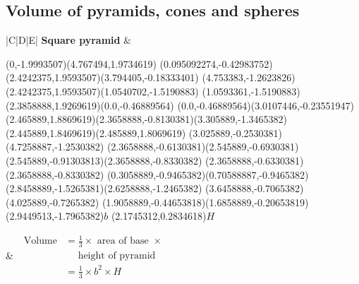 \subsection{Volume of pyramids, cones and spheres}


\begin{table}[H]
\begin{tabular}{|C|D|E|}
\hline
\textbf{Square pyramid}
&
\begin{center}
\scalebox{1} %
{
\scalebox{1} %
{
\begin{pspicture}(0,-1.9993507)(4.767494,1.9734619)
\pspolygon[linewidth=0.028222222,fillstyle=solid](0.095092274,-0.42983752)(2.4242375,1.9593507)(3.794405,-0.18333401)
\pspolygon[linewidth=0.028222222,fillstyle=solid](4.753383,-1.2623826)(2.4242375,1.9593507)(1.0540702,-1.5190883)
\pspolygon[linewidth=0.028222222,fillstyle=solid](1.0593361,-1.5190883)(2.3858888,1.9269619)(0.0,-0.46889564)
\psline[linewidth=0.022cm,linestyle=dashed,dash=0.16cm 0.16cm](0.0,-0.46889564)(3.0107446,-0.23551947)
\psline[linewidth=0.027999999,linestyle=dotted,dotsep=0.16cm](2.465889,1.8869619)(2.3658888,-0.8130381)(3.305889,-1.3465382)(2.445889,1.8469619)(2.485889,1.8069619)
\psline[linewidth=0.024cm,linestyle=dashed,dash=0.16cm 0.16cm](3.025889,-0.2530381)(4.7258887,-1.2530382)
\psline[linewidth=0.02](2.3658888,-0.6130381)(2.545889,-0.6930381)(2.545889,-0.91303813)(2.3658888,-0.8330382)
\psline[linewidth=0.02cm](2.3658888,-0.6330381)(2.3658888,-0.8330382)
\psline[linewidth=0.04cm](0.3058889,-0.9465382)(0.70588887,-0.9465382)
\psline[linewidth=0.04cm](2.8458889,-1.5265381)(2.6258888,-1.2465382)
\psline[linewidth=0.04cm](3.6458888,-0.7065382)(4.025889,-0.7265382)
\psline[linewidth=0.04cm](1.9058889,-0.44653818)(1.6858889,-0.20653819)
\rput(2.9449513,-1.7965382){$b$}
\rput(2.1745312,0.2834618){$H$}
\end{pspicture} 
}

}
\end{center} 
&
$\begin{aligned}
\mbox{ Volume} &=  \frac{1}{3} \times \mbox{ area of base } \times\\
&~~~~~~ \mbox{height of pyramid }\\
&=\frac{1}{3}\times b^{2} \times H
 \end{aligned}$
\\ \hline



\end{tabular}
\end{table}
